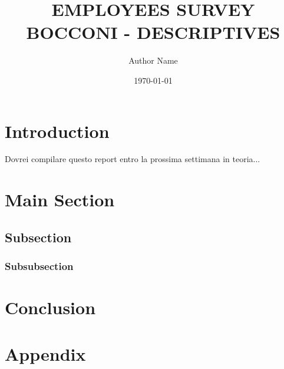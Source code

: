\documentclass[12pt]{article}
\title{EMPLOYEES SURVEY BOCCONI - DESCRIPTIVES}
\author{Author Name}
\date{\today}
\numberwithin{figure}{section}
\numberwithin{table}{section}
\begin{document}
\maketitle


\section{Introduction}
Dovrei compilare questo report entro la prossima settimana in teoria...

\section{Main Section}



\subsection{Subsection}
\blindtext

\subsubsection{Subsubsection}
\blindtext

\section{Conclusion}
\blindtext

\newpage
\appendix
\section*{Appendix}





\end{document}
